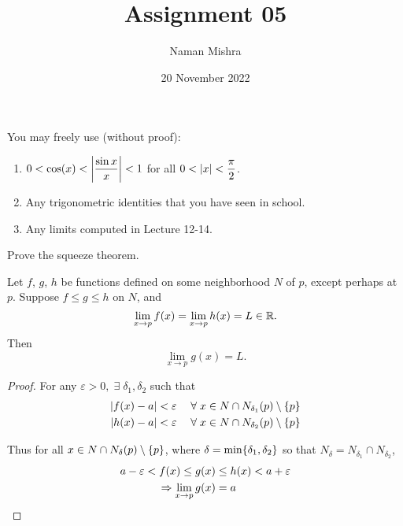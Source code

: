 \documentclass[12pt]{article}
\title{Assignment 05}
\author{Naman Mishra}
\date{20 November 2022}
\begin{document}
\maketitle

You may freely use (without proof):
\begin{enumerate}[label=(\roman*)]
    \item $0 < \cos(x) < \abs{\dfrac{\sin x}{x}} < 1$ for all $0 < \abs{x} < \dfrac{\pi}{2}$.
    \item Any trigonometric identities that you have seen in school.
    \item Any limits computed in Lecture 12-14.
\end{enumerate}

\begin{problem}
    Prove the squeeze theorem.
\end{problem}
\begin{thm} \label{thm:limit:squeeze}
    Let $f$, $g$, $h$ be functions defined on some neighborhood $N$ of $p$, except perhaps at $p$. Suppose $f \leq g \leq h$ on $N$, and \[
        \lim_{x \to p} f(x) = \lim_{x \to p} h(x) = L \in \R.
    \] Then \[
        \lim_{x \to p} g(x) = L.
    \]
\end{thm}
\begin{proof}
    For any $\varepsilon > 0, \;\exists\; \delta_{1}, \delta_{2}$ such that \begin{align*}
        \abs{f(x) - a} &< \varepsilon \quad\;\forall\; x \in N \cap N_{\delta_{1}}(p) \setminus \set{p} \\
        \abs{h(x) - a} &< \varepsilon \quad\;\forall\; x \in N \cap N_{\delta_{2}}(p) \setminus \set{p}
    \end{align*}

    Thus for all $x \in N \cap N_{\delta}(p) \setminus \set{p}$, where $\delta = \min\set{\delta_{1}, \delta_{2}}$ so that $N_{\delta} = N_{\delta_{1}} \cap N_{\delta_{2}}$,
    \begin{align*}
        a - \varepsilon < f(x) \leq g(x) &\leq h(x) < a + \varepsilon \\
        \implies \lim_{x \to p} g(x) &= a \qedhere
    \end{align*}
\end{proof}
\end{document}
